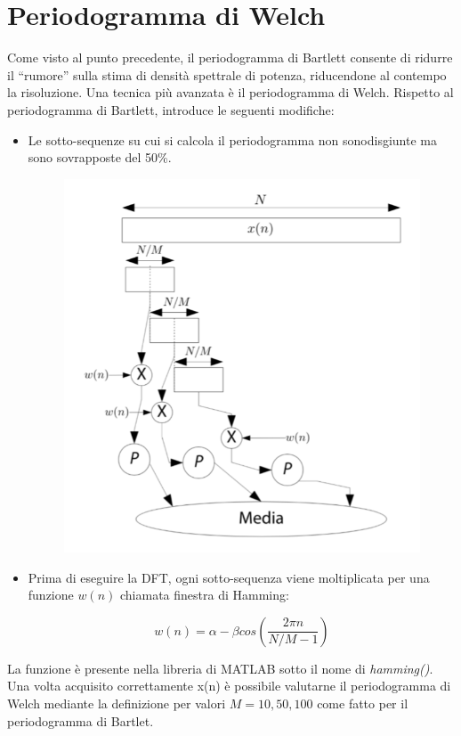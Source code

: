 
\section{Periodogramma di Welch}
Come visto al punto precedente, il periodogramma di Bartlett consente di ridurre 
il “rumore” sulla stima di densità spettrale di potenza, riducendone al contempo 
la risoluzione. Una tecnica più avanzata è il periodogramma di Welch. Rispetto al 
periodogramma di Bartlett, introduce le seguenti modiﬁche:

\begin{itemize}
	\item Le sotto-sequenze su cui si calcola il periodogramma non sonodisgiunte 
	ma sono sovrapposte del 50\%.

	\begin{figure}[H]
		\centering
		\includegraphics[width=.5\textwidth]{./images/cap4/welch_schema.png}
	\end{figure}

	\item  Prima di eseguire la DFT, ogni sotto-sequenza viene moltiplicata per 
	una funzione $w(n)$ chiamata ﬁnestra di Hamming:
	
	\begin{equation*}
		w(n) = \alpha - \beta cos(\frac{2 \pi n}{N/M -1})
	\end{equation*}	
\end{itemize}

La funzione è presente nella libreria di MATLAB sotto il nome di \textit{hamming()}.
Una volta acquisito correttamente x(n) è possibile valutarne il periodogramma di 
Welch mediante la deﬁnizione per valori $M = 10, 50, 100$ come fatto per il 
periodogramma di Bartlet.

